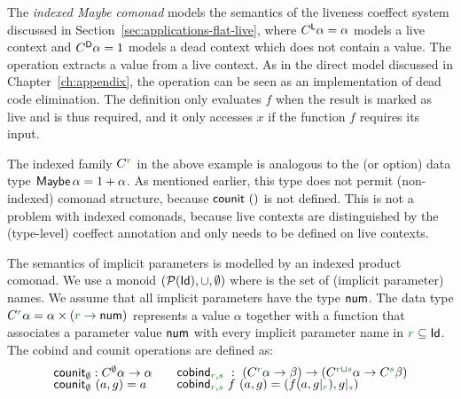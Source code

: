 \noindent
The \emph{indexed Maybe comonad} models the semantics of the liveness coeffect system discussed in
Section~\ref{sec:applications-flat-live}, where $C^{\textnormal{\sffamily L}}\alpha = \alpha$ models a live context
and $C^{\textnormal{\sffamily D}}\alpha=1$ models a dead context which does not contain a value. The 
operation extracts a value from a live context. As in the direct model discussed in Chapter~\ref{ch:appendix},
the  operation can be seen as an implementation of dead code elimination. The definition
only evaluates $f$ when the result is marked as live and is thus required, and it only accesses $x$ if
the function $f$ requires its input.

The indexed family $\ctyp{\cclrd{r}}{}$ in the above example is analogous to the 
(or option) data type $\textnormal{\sffamily Maybe}\,\alpha = 1 + \alpha$. As mentioned earlier, this type does not
permit (non-indexed) comonad structure, because $\textnormal{\sffamily counit}~()$ is not defined. This is not a
problem with indexed comonads, because live contexts are distinguished by the (type-level) coeffect
annotation and  only needs to be defined on live contexts.

\begin{example}
The semantics of implicit parameters is modelled by an indexed product comonad. We use a monoid
$(\mathcal{P}(\textnormal{\sffamily Id}), \cup, \emptyset)$ where  is the set of (implicit parameter) names.
We assume that all implicit parameters have the type $\textnormal{\sffamily num}$. The data type $\ctyp{\cclrd{r}}{\alpha}
= \alpha \times (\cclrd{r} \rightarrow \ident{num})$ represents a value $\alpha$ together with a function that
associates a parameter value $\textnormal{\sffamily num}$ with every implicit parameter name in $\cclrd{r} \subseteq \ident{Id}$.
The cobind and counit operations are defined as:
%
\begin{equation*}
\begin{array}{l}
\ident{counit}_{\emptyset} : \ctyp{\emptyset}{\alpha} \rightarrow \alpha \\[-0.25em]
\ident{counit}_{\emptyset}~(a, g) = a\\[0.5em]
\end{array}
\quad
\begin{array}{l}
\ident{cobind}_{\cclrd{r},\cclrd{s}} ~:~ (\ctyp{\cclrd{r}}{\alpha} \rightarrow \beta)
    \rightarrow (\ctyp{\cclrd{r}\cup\cclrd{s}}{\alpha} \rightarrow \ctyp{\cclrd{s}}{\beta})\\[-0.25em]
\ident{cobind}_{\cclrd{r},\cclrd{s}}~f~(a,g) = (f(a,\restr{g}{\cclrd{r}}), \restr{g}{\cclrd{s}})\\[0.5em]
\end{array}
\end{equation*}
\end{example}

